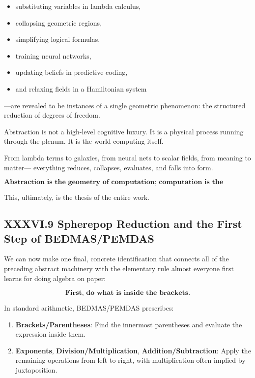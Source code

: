\documentclass[11pt,letterpaper]{article}
\begin{document}
\begin{itemize}
    \item substituting variables in lambda calculus,
    \item collapsing geometric regions,
    \item simplifying logical formulas,
    \item training neural networks,
    \item updating beliefs in predictive coding,
    \item and relaxing fields in a Hamiltonian system
\end{itemize}

—are revealed to be instances of a single geometric phenomenon:
the structured reduction of degrees of freedom.

Abstraction is not a high-level cognitive luxury.  
It is a physical process running through the plenum.  
It is the world computing itself.

From lambda terms to galaxies,  
from neural nets to scalar fields,  
from meaning to matter—  
everything reduces, collapses, evaluates, and falls into form.

\[
\boxed{
\textbf{
Abstraction is the geometry of computation;  
computation is the geometry of meaning;  
meaning is the geometry of the plenum.}
}
\]

This, ultimately, is the thesis of the entire work.
\newpage

\subsection{XXXVI.9 Spherepop Reduction and the First Step of BEDMAS/PEMDAS}

We can now make one final, concrete identification that connects all of the
preceding abstract machinery with the elementary rule almost everyone first
learns for doing algebra on paper:

\[
\textbf{First, do what is inside the brackets.}
\]

In standard arithmetic, BEDMAS/PEMDAS prescribes:

\begin{enumerate}
  \item \textbf{Brackets/Parentheses}: Find the innermost parentheses and evaluate the expression inside them.
  \item \textbf{Exponents}, \textbf{Division/Multiplication}, \textbf{Addition/Subtraction}: Apply the remaining operations from left to right, with multiplication often implied by juxtaposition.
\end{enumerate}
\end{document}
